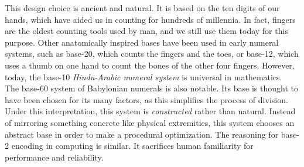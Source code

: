 This design choice is ancient and natural. It is based on the ten digits of our hands, which have aided us in counting for hundreds of millennia. In fact, fingers are the oldest counting tools used by man, and we still use them today for this purpose. Other anatomically inspired bases have been used in early numeral systems, such as base-20, which counts the fingers and the toes, or base-12, which uses a thumb on one hand to count the bones of the other four fingers. However, today, the base-10 \textit{Hindu-Arabic numeral system} is universal in mathematics. \\

The base-60 system of Babylonian numerals is also notable. Its base is thought to have been chosen for its many factors, as this simplifies the process of division. Under this interpretation, this system is \textit{constructed} rather than natural. Instead of mirroring something concrete like physical extremities, this system chooses an abstract base in order to make a procedural optimization. The reasoning for base-2 encoding in computing is similar. It sacrifices human familiarity for performance and reliability. \\\\

